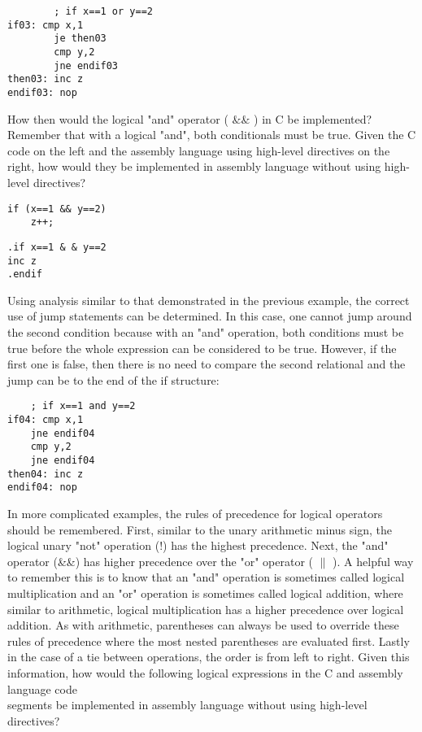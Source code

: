 \documentclass[10pt]{article}
\begin{document}
\begin{verbatim}
        ; if x==1 or y==2
if03: cmp x,1
        je then03
        cmp y,2
        jne endif03
then03: inc z
endif03: nop
\end{verbatim}

How then would the logical "and" operator ( $\& \&$ ) in C be implemented? Remember that with a logical "and", both conditionals must be true. Given the C code on the left and the assembly language using high-level directives on the right, how would they be implemented in assembly language without using high-level directives?

\begin{verbatim}
if (x==1 && y==2)
    z++;
\end{verbatim}

\begin{verbatim}
.if x==1 & & y==2
inc z
.endif
\end{verbatim}

Using analysis similar to that demonstrated in the previous example, the correct use of jump statements can be determined. In this case, one cannot jump around the second condition because with an "and" operation, both conditions must be true before the whole expression can be considered to be true. However, if the first one is false, then there is no need to compare the second relational and the jump can be to the end of the if structure:

\begin{verbatim}
    ; if x==1 and y==2
if04: cmp x,1
    jne endif04
    cmp y,2
    jne endif04
then04: inc z
endif04: nop
\end{verbatim}

In more complicated examples, the rules of precedence for logical operators should be remembered. First, similar to the unary arithmetic minus sign, the logical unary "not" operation (!) has the highest precedence. Next, the "and" operator (\&\&) has higher precedence over the "or" operator ( $\|$ ). A helpful way to remember this is to know that an "and" operation is sometimes called logical multiplication and an "or" operation is sometimes called logical addition, where similar to arithmetic, logical multiplication has a higher precedence over logical addition. As with arithmetic, parentheses can always be used to override these rules of precedence where the most nested parentheses are evaluated first. Lastly in the case of a tie between operations, the order is from left to right. Given this information, how would the following logical expressions in the C and assembly language code\\
segments be implemented in assembly language without using high-level directives?
\end{document}
